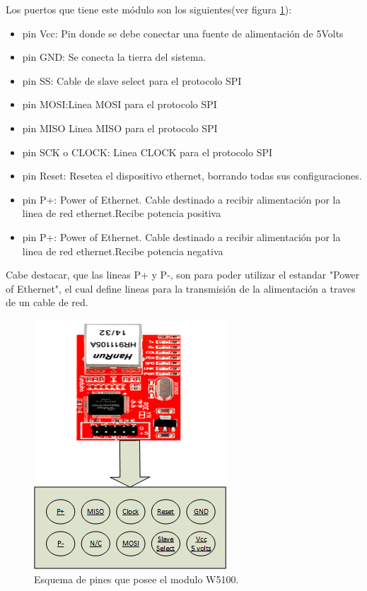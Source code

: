 Los puertos que tiene este módulo son los siguientes(ver figura \ref{fig:ap_ethernet}):

\begin{itemize}
	\item pin Vcc: Pin donde se debe conectar una fuente de alimentación de 5Volts
	\item pin GND: Se conecta la tierra del sistema. 
	\item pin SS: Cable de slave select para el protocolo SPI 
	\item pin MOSI:Linea MOSI para el protocolo SPI  
	\item pin MISO Linea MISO para el protocolo SPI  
	\item pin SCK o CLOCK: Linea CLOCK para el protocolo SPI  
	\item pin Reset: Resetea el dispositivo ethernet, borrando todas sus configuraciones. 
	\item pin P+: Power of Ethernet. Cable destinado a recibir alimentación por la linea de red ethernet.Recibe potencia positiva 
	\item pin P+: Power of Ethernet. Cable destinado a recibir alimentación por la linea de red ethernet.Recibe potencia negativa  
\end{itemize}

Cabe destacar, que las lineas P+ y P-, son para poder utilizar el estandar "Power of Ethernet", el cual define lineas para la transmisión de la alimentación a traves de un cable de red. 

\begin{figure}[ht]
	\centering 
	\includegraphics{parte_2/soft_micro/pinoutW5100}
	\caption{Esquema de pines que posee el modulo W5100.} 
	\label{fig:ap_ethernet}
\end{figure}

